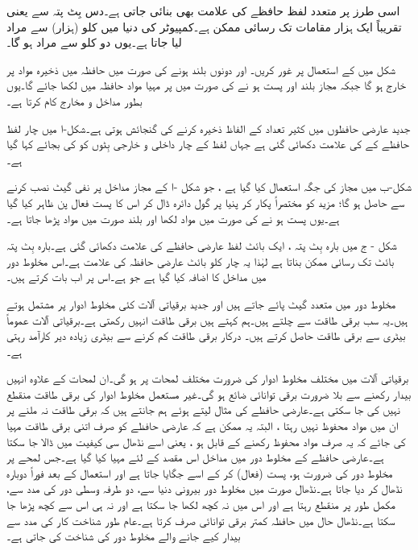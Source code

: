 اسی طرز پر متعدد لفظ  حافظے  کی علامت   بھی بنائی جاتی ہے۔دس بِٹ پتہ سے     یعنی  تقریباً ایک ہزار مقامات تک رسائی ممکن ہے۔کمپیوٹر کی دنیا  میں  کلو (ہزار) سے مراد     لیا جاتا ہے۔یوں دو  کلو سے مراد   ہو گا۔


شکل   میں    کے استعمال  پر غور کریں۔ اور     دونوں بلند ہونے کی صورت میں  حافظہ میں ذخیرہ مواد    پر خارج ہو گا جبکہ  مجاز بلند اور     پست ہو نے  کی صورت میں   پر  مہیا مواد حافظہ میں لکھا جائے گا۔یوں  بطور مداخل و مخارج   کام کرتا ہے۔

جدید عارضی حافظوں میں کثیر تعداد  کے الفاظ ذخیرہ کرنے کی گنجائش ہوتی ہے۔شکل-ا میں چار  لفظ  حافظے کے  کی علامت دکھائی گئی ہے  جہاں لفظ کے چار داخلی  و خارجی بِٹوں  کو  کی  بجائے  کہا گیا ہے۔

شکل-ب  میں مجاز کی جگہ  استعمال کیا گیا ہے ، جو شکل -ا کے مجاز مداخل پر نفی گیٹ نصب کرنے سے حاصل  ہو گا؛  مزید     کو مختصراً     پکار کر   پنیا پر گول دائرہ  ڈال کر اس کا  پست فعال  پن ظاہر کیا گیا ہے۔یوں  پست ہو نے کی صورت میں مواد لکھا اور بلند صورت میں     مواد پڑھا جاتا ہے۔

شکل - ج میں  بارہ بِٹ پتہ ،  ایک بائٹ   لفظ عارضی حافظے کی علامت دکھائی گئی ہے۔بارہ بِٹ پتہ   بائٹ تک رسائی ممکن بناتا  ہے لہٰذا  یہ چار کلو بائٹ عارضی حافظہ کی   علامت ہے۔اس مخلوط دور  میں   مداخل کا اضافہ کیا گیا ہے جو  ہے۔اس پر اب بات کرتے ہیں۔


 مخلوط دور میں متعدد  گیٹ پائے جاتے ہیں اور جدید  برقیاتی  آلات کئی مخلوط ادوار پر مشتمل ہوتے ہیں۔یہ سب  برقی طاقت سے چلتے ہیں۔ہم کہتے ہیں برقی طاقت انہیں  رکھتی  ہے۔برقیاتی  آلات عموماً  بیٹری سے برقی طاقت حاصل کرتے ہیں۔ درکار برقی طاقت کم  کرنے سے بیٹری زیادہ دیر کارآمد رہتی ہے۔
 
برقیاتی آلات میں مختلف مخلوط ادوار کی  ضرورت مختلف   لمحات  پر  ہو گی۔ان لمحات کے علاوہ انہیں بیدار رکھنے سے بلا ضرورت برقی توانائی   ضائع ہو گی۔غیر مستعمل  مخلوط ادوار کی برقی طاقت منقطع نہیں کی جا سکتی ہے۔عارضی حافظے کی مثال لیتے  ہوئے ہم  جانتے ہیں  کہ برقی طاقت نہ ملنے پر ان میں مواد محفوظ نہیں رہتا ، البتہ یہ  ممکن ہے کہ عارضی حافظے کو صرف اتنی برقی طاقت مہیا کی جائے کہ یہ صرف مواد محفوظ رکھنے کے قابل ہو ، یعنی اسے  نڈھال سی کیفیت میں ڈالا جا سکتا ہے۔عارضی حافظے  کے مخلوط دور میں   مداخل اس مقصد کے لئے مہیا کیا گیا ہے۔جس لمحے پر مخلوط دور کی ضرورت ہو،      پست (فعال)  کر کے اسے  جگایا جاتا ہے اور استعمال کے بعد فوراً دوبارہ نڈھال کر دیا جاتا ہے۔نڈھال صورت میں مخلوط دور بیرونی دنیا سے، دو طرفہ وسطی دور کی مدد سے، مکمل طور  پر منقطع رہتا ہے اور اس میں نہ کچھ لکھا جا سکتا ہے اور نہ ہی اس سے کچھ پڑھا جا سکتا ہے۔نڈھال حال  میں حافظہ کمتر برقی توانائی صرف کرتا   ہے۔عام طور شناخت کار کی مدد سے   بیدار کیے جانے والے مخلوط دور کی  شناخت کی جاتی ہے۔

